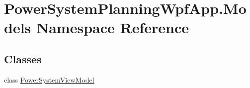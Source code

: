 \hypertarget{namespace_power_system_planning_wpf_app_1_1_models}{}\section{Power\+System\+Planning\+Wpf\+App.\+Models Namespace Reference}
\label{namespace_power_system_planning_wpf_app_1_1_models}
\subsection*{Classes}
\begin{DoxyCompactItemize}
\item 
class \hyperlink{class_power_system_planning_wpf_app_1_1_models_1_1_power_system_view_model}{Power\+System\+View\+Model}
\end{DoxyCompactItemize}
